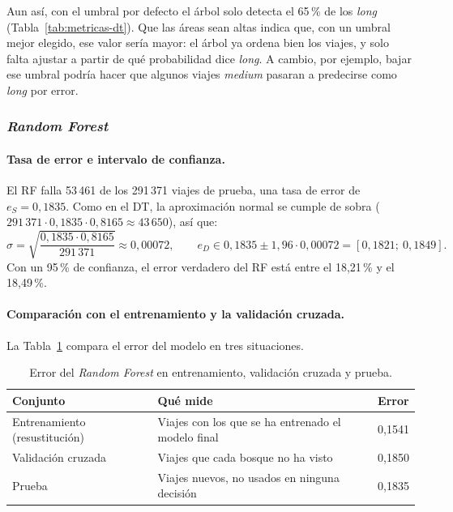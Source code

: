 \documentclass[12pt,a4paper]{article}
\begin{document}
Aun así, con el umbral por defecto el árbol solo detecta el 65\,\% de los
\textit{long} (Tabla~\ref{tab:metricas-dt}). Que las áreas sean altas
indica que, con un umbral mejor elegido, ese valor sería mayor: el árbol
ya ordena bien los viajes, y solo falta ajustar a partir de qué
probabilidad dice \textit{long}. A cambio, por ejemplo, bajar ese umbral podría hacer que
algunos viajes \textit{medium} pasaran a predecirse como \textit{long} por
error.

\subsubsection{\textit{Random Forest}}
\label{sec:eval-rf}

\paragraph{Tasa de error e intervalo de confianza.} El \ac{RF} falla
53\,461 de los 291\,371 viajes de prueba, una tasa de error de
$e_S = 0{,}1835$. Como en el \ac{DT}, la aproximación normal se cumple de
sobra ($291\,371 \cdot 0{,}1835 \cdot 0{,}8165 \approx 43\,650$), así que:
\[
\sigma = \sqrt{\frac{0{,}1835 \cdot 0{,}8165}{291\,371}} \approx 0{,}00072,
\qquad
e_D \in 0{,}1835 \pm 1{,}96 \cdot 0{,}00072 = [0{,}1821;\ 0{,}1849] .
\]
Con un 95\,\% de confianza, el error verdadero del \ac{RF} está entre el
18,21\,\% y el 18,49\,\%.

\paragraph{Comparación con el entrenamiento y la validación cruzada.} La
Tabla~\ref{tab:errores-rf} compara el error del modelo en tres situaciones.

\begin{table}[H]
\centering
\small
\begin{tabular}{lll}
\toprule
\textbf{Conjunto} & \textbf{Qué mide} & \textbf{Error} \\
\midrule
Entrenamiento (resustitución) & Viajes con los que se ha entrenado el modelo final & 0,1541 \\
Validación cruzada & Viajes que cada bosque no ha visto & 0,1850 \\
Prueba & Viajes nuevos, no usados en ninguna decisión & 0,1835 \\
\bottomrule
\end{tabular}
\caption{Error del \textit{Random Forest} en entrenamiento, validación
cruzada y prueba.}
\label{tab:errores-rf}
\end{table}
\end{document}
